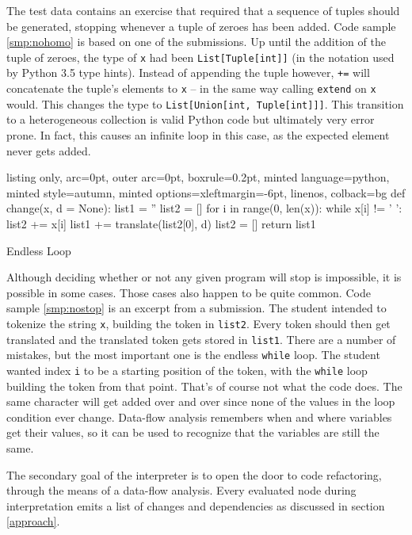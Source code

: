 \documentclass[a4paper, 16pt, oneside]{Thesis}
\begin{document}
The test data contains an exercise that required that a sequence of
tuples should be generated, stopping whenever a tuple of zeroes has been
added. Code sample \ref{smp:nohomo} is based on one of the submissions.
Up until the addition of the tuple of zeroes, the type of \texttt{x} had
been \texttt{List{[}Tuple{[}int{]}{]}} (in the notation used by Python
3.5 type hints). Instead of appending the tuple however, \texttt{+=}
will concatenate the tuple's elements to \texttt{x} -- in the same way
calling \texttt{extend} on \texttt{x} would. This changes the type to
\texttt{List{[}Union{[}int,\ Tuple{[}int{]}{]}{]}}. This transition to a
heterogeneous collection is valid Python code but ultimately very error
prone. In fact, this causes an infinite loop in this case, as the
expected element never gets added.

\begin{code}
  \begin{tcblisting}{listing only, 
  arc=0pt,
  outer arc=0pt, 
  boxrule=0.2pt,
  minted language=python,
  minted style=autumn,
  minted options={xleftmargin=-6pt, linenos},
  colback=bg }
def change(x, d = None):
  list1 = ''
  list2 = []
  for i in range(0, len(x)):
    while x[i] != ' ':
      list2 += x[i]
    list1 += translate(list2[0], d)
    list2 = []
  return list1
\end{tcblisting}
\caption{Endless Loop} \label{smp:nostop}
\end{code}

Although deciding whether or not any given program will stop is
impossible, it is possible in some cases. Those cases also happen to be
quite common. Code sample \ref{smp:nostop} is an excerpt from a
submission. The student intended to tokenize the string \texttt{x},
building the token in \texttt{list2}. Every token should then get
translated and the translated token gets stored in \texttt{list1}. There
are a number of mistakes, but the most important one is the endless
\texttt{while} loop. The student wanted index \texttt{i} to be a
starting position of the token, with the \texttt{while} loop building
the token from that point. That's of course not what the code does. The
same character will get added over and over since none of the values in
the loop condition ever change. Data-flow analysis remembers when and
where variables get their values, so it can be used to recognize that
the variables are still the same.

The secondary goal of the interpreter is to open the door to code
refactoring, through the means of a data-flow analysis. Every evaluated
node during interpretation emits a list of changes and dependencies as
discussed in section \ref{approach}.
\end{document}
